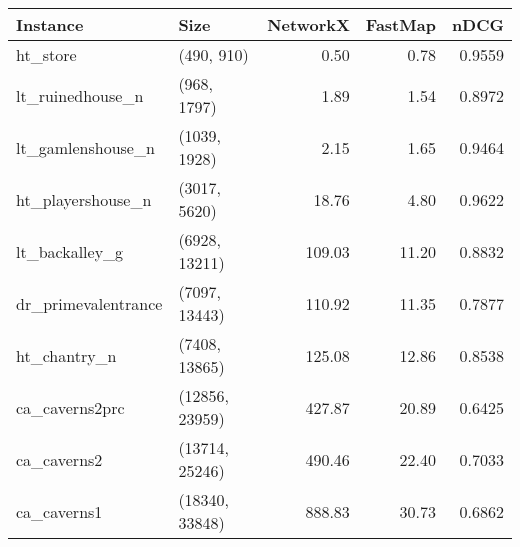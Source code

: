 \begin{tabular}{llrrr}
\toprule
           Instance &           Size &  NetworkX &  FastMap &   nDCG \\
\midrule
           ht\_store &     (490, 910) &      0.50 &     0.78 & 0.9559 \\
   lt\_ruinedhouse\_n &    (968, 1797) &      1.89 &     1.54 & 0.8972 \\
  lt\_gamlenshouse\_n &   (1039, 1928) &      2.15 &     1.65 & 0.9464 \\
  ht\_playershouse\_n &   (3017, 5620) &     18.76 &     4.80 & 0.9622 \\
     lt\_backalley\_g &  (6928, 13211) &    109.03 &    11.20 & 0.8832 \\
dr\_primevalentrance &  (7097, 13443) &    110.92 &    11.35 & 0.7877 \\
       ht\_chantry\_n &  (7408, 13865) &    125.08 &    12.86 & 0.8538 \\
     ca\_caverns2prc & (12856, 23959) &    427.87 &    20.89 & 0.6425 \\
        ca\_caverns2 & (13714, 25246) &    490.46 &    22.40 & 0.7033 \\
        ca\_caverns1 & (18340, 33848) &    888.83 &    30.73 & 0.6862 \\
\bottomrule
\end{tabular}
